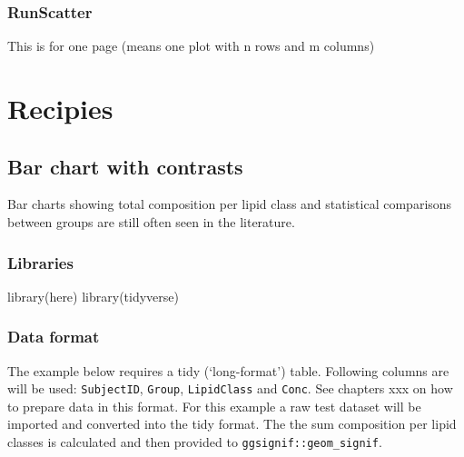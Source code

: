 \documentclass[
  letterpaper,
  DIV=11,
  numbers=noendperiod]{scrreprt}
\newenvironment{Shaded}{\begin{snugshade}}{\end{snugshade}}
\newcommand{\FunctionTok}[1]{\textcolor[rgb]{0.28,0.35,0.67}{#1}}
\newcommand{\NormalTok}[1]{\textcolor[rgb]{0.00,0.23,0.31}{#1}}
\begin{document}
\hypertarget{runscatter}{%
\section{RunScatter}\label{runscatter}}

This is for one page (means one plot with n rows and m columns)

\part{Recipies}

\hypertarget{section}{%
\section*{}\label{section}}

\hypertarget{bar-chart-with-contrasts}{%
\chapter{Bar chart with contrasts}\label{bar-chart-with-contrasts}}

Bar charts showing total composition per lipid class and statistical
comparisons between groups are still often seen in the literature.

\hypertarget{libraries-2}{%
\section{Libraries}\label{libraries-2}}

\begin{Shaded}
\begin{Highlighting}[]
\FunctionTok{library}\NormalTok{(here)}
\FunctionTok{library}\NormalTok{(tidyverse)}
\end{Highlighting}
\end{Shaded}

\hypertarget{data-format-1}{%
\section{Data format}\label{data-format-1}}

The example below requires a tidy (`long-format') table. Following
columns are will be used: \texttt{SubjectID}, \texttt{Group},
\texttt{LipidClass} and \texttt{Conc}. See chapters xxx on how to
prepare data in this format. For this example a raw test dataset will be
imported and converted into the tidy format. The the sum composition per
lipid classes is calculated and then provided to
\texttt{ggsignif::geom\_signif}.
\end{document}
